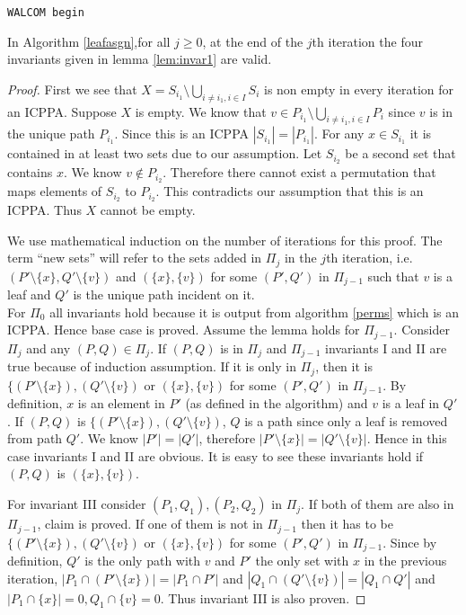 {\tt WALCOM begin}
\begin{lemma}
  \label{lem:invar3}
  In Algorithm \ref{leafasgn},for all $j \geq 0$, at the end of the
  $j$th iteration the four invariants given in lemma \ref{lem:invar1}
  are valid.
\end{lemma}
\begin{proof}
  First we see that $X = S_{i_1} \setminus \bigcup_{i \ne i_1, i \in
    I}S_i$ is non empty in every iteration for an ICPPA. Suppose $X$
  is empty. We know that $v \in P_{i_1} \setminus \bigcup_{i \ne i_1,
    i \in I}P_i$ since $v$ is in the unique path $P_{i_1}$. Since this
  is an ICPPA $|S_{i_1}| = |P_{i_1}|$. For any $x \in S_{i_1}$ it is
  contained in at least two sets due to our assumption. Let $S_{i_2}$
  be a second set that contains $x$. We know $v \notin
  P_{i_2}$. Therefore there cannot exist a permutation that maps
  elements of $S_{i_2}$ to $P_{i_2}$. This contradicts our assumption
  that this is an ICPPA. Thus $X$ cannot be empty.


  We use mathematical induction on the number of iterations for this
  proof. The term ``new sets'' will refer to the sets added in $\Pi_j$
  in the $j$th iteration, i.e. $(P' \setminus \{x\},Q' \setminus
  \{v\})$ and $(\{x\},\{v\})$ for some $(P',Q')$ in $\Pi_{j-1}$ such
  that $v$ is a leaf and $Q'$ is the unique path
  incident on it.\\
  For $\Pi_0$ all invariants hold because it is output from algorithm
  \ref{perms} which is an ICPPA. Hence base case is proved.  Assume
  the lemma holds for $\Pi_{j-1}$. Consider $\Pi_j$ and any $(P,Q) \in
  \Pi_j$. If $(P,Q) $ is in $ \Pi_j$ and $\Pi_{j-1}$ invariants I and
  II are true because of induction assumption. If it is only in
  $\Pi_j$, then it is $\{(P' \setminus \{x\}),(Q' \setminus \{v\})$ or
  $(\{x\},\{v\})$ for some $(P',Q')$ in $\Pi_{j-1}$. By definition,
  $x$ is an element in $P'$ (as defined in the algorithm) and $v$ is a
  leaf in $Q'$. If $(P,Q)$ is $\{(P' \setminus \{x\}),(Q' \setminus
  \{v\})$, $Q$ is a path since only a leaf is removed from path
  $Q'$. We know $|P'| = |Q'|$, therefore $|P' \setminus \{x\}| = |Q'
  \setminus \{v\}|$. Hence in this case invariants I and II are
  obvious. It is easy to see these invariants hold if $(P,Q)$ is
  $(\{x\},\{v\})$.


  For invariant III consider $(P_1,Q_1),(P_2,Q_2)$ in $\Pi_j$. If both
  of them are also in $\Pi_{j-1}$, claim is proved. If one of them is
  not in $\Pi_{j-1}$ then it has to be $\{(P' \setminus \{x\}),(Q'
  \setminus \{v\})$ or $(\{x\},\{v\})$ for some $(P',Q')$ in
  $\Pi_{j-1}$. Since by definition, $Q'$ is the only path with $v$ and
  $P'$ the only set with $x$ in the previous iteration, $|P_1 \cap (P'
  \setminus \{x\})| = |P_1 \cap P'|$ and $|Q_1 \cap (Q' \setminus
  \{v\})| = |Q_1 \cap Q'|$ and $|P_1 \cap \{x\}| = 0, Q_1 \cap \{v\} =
  0$. Thus invariant III is also proven.


\end{proof}
